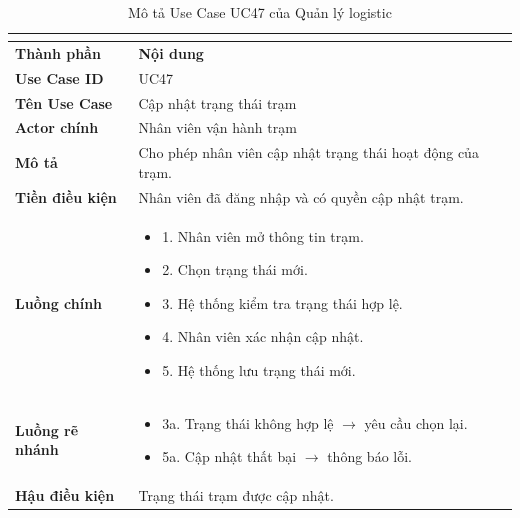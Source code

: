 \begin{longtable}{|C{3cm}|L{11cm}|}
\caption{Mô tả Use Case UC47 của Quản lý logistic}\\
\label{tab:mo-ta-uc47-quan-ly-logistic}\\
\hline
\textbf{Thành phần} & \textbf{Nội dung} \\
\hline
\textbf{Use Case ID} & UC47 \\
\hline
\textbf{Tên Use Case} & Cập nhật trạng thái trạm \\
\hline
\textbf{Actor chính} & Nhân viên vận hành trạm \\
\hline
\textbf{Mô tả} & Cho phép nhân viên cập nhật trạng thái hoạt động của trạm. \\
\hline
\textbf{Tiền điều kiện} & Nhân viên đã đăng nhập và có quyền cập nhật trạm. \\
\hline
\textbf{Luồng chính} &
\begin{itemize}[leftmargin=*,topsep=2pt,itemsep=2pt]
    \item 1. Nhân viên mở thông tin trạm.
    \item 2. Chọn trạng thái mới.
    \item 3. Hệ thống kiểm tra trạng thái hợp lệ.
    \item 4. Nhân viên xác nhận cập nhật.
    \item 5. Hệ thống lưu trạng thái mới.
\end{itemize} \\
\hline
\textbf{Luồng rẽ nhánh} &
\begin{itemize}[leftmargin=*,topsep=2pt,itemsep=2pt]
    \item 3a. Trạng thái không hợp lệ $\rightarrow$ yêu cầu chọn lại.
    \item 5a. Cập nhật thất bại $\rightarrow$ thông báo lỗi.
\end{itemize} \\
\hline
\textbf{Hậu điều kiện} & Trạng thái trạm được cập nhật. \\
\hline
\end{longtable}


